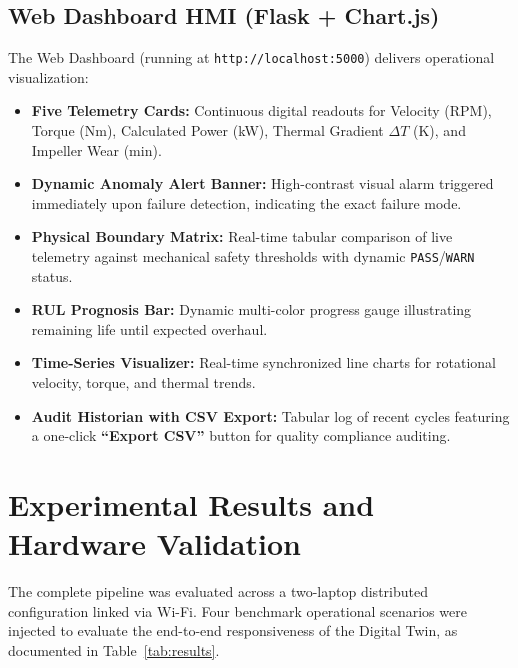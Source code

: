 \documentclass[11pt,a4paper]{article}
\begin{document}
\subsection{Web Dashboard HMI (Flask + Chart.js)}
The Web Dashboard (running at \texttt{http://localhost:5000}) delivers operational visualization:
\begin{itemize}
    \item \textbf{Five Telemetry Cards:} Continuous digital readouts for Velocity (RPM), Torque (Nm), Calculated Power (kW), Thermal Gradient $\Delta T$ (K), and Impeller Wear (min).
    \item \textbf{Dynamic Anomaly Alert Banner:} High-contrast visual alarm triggered immediately upon failure detection, indicating the exact failure mode.
    \item \textbf{Physical Boundary Matrix:} Real-time tabular comparison of live telemetry against mechanical safety thresholds with dynamic \texttt{PASS}/\texttt{WARN} status.
    \item \textbf{RUL Prognosis Bar:} Dynamic multi-color progress gauge illustrating remaining life until expected overhaul.
    \item \textbf{Time-Series Visualizer:} Real-time synchronized line charts for rotational velocity, torque, and thermal trends.
    \item \textbf{Audit Historian with CSV Export:} Tabular log of recent cycles featuring a one-click \textbf{``Export CSV''} button for quality compliance auditing.
\end{itemize}

\section{Experimental Results and Hardware Validation}

The complete pipeline was evaluated across a two-laptop distributed configuration linked via Wi-Fi. Four benchmark operational scenarios were injected to evaluate the end-to-end responsiveness of the Digital Twin, as documented in Table~\ref{tab:results}.
\end{document}
